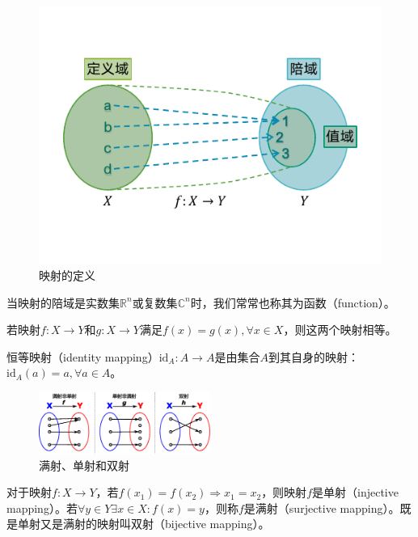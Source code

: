 \documentclass[../main.tex]{subfiles}
\begin{document}
\begin{figure}[htbp]
    \centering
    \includegraphics{../images/II.1.1.pdf}
    \caption{映射的定义}
    \label{fig:II.1.1}
\end{figure}

当映射的陪域是实数集$\mathbb{R}^n$或复数集$\mathbb{C}^n$时，我们常常也称其为函数（function）。

\begin{definition}[映射的相等]
    若映射$f:X\rightarrow Y$和$g:X\rightarrow Y$满足$f\left(x\right)=g\left(x\right),\forall x\in X$，则这两个映射相等。
\end{definition}

\begin{definition}[恒等映射]
    恒等映射（identity mapping）$\mathrm{id}_A:A\rightarrow A$是由集合$A$到其自身的映射：$\mathrm{id}_A\left(a\right)=a,\forall a\in A$。
\end{definition}

\begin{figure}[htbp]
    \centering
    \includegraphics[width=0.5\textwidth]{../images/II.1.2.eps}
    \caption{满射、单射和双射}
    \label{fig:II.1.2}
\end{figure}

\begin{definition}[单射、双射、满射]
    对于映射$f:X\rightarrow Y$，若$f\left(x_1\right)=f\left(x_2\right)\Rightarrow x_1=x_2$，则映射$f$是单射（injective mapping）。若$\forall y\in Y\exists x\in X:f\left(x\right)=y$，则称$f$是满射（surjective mapping）。既是单射又是满射的映射叫双射（bijective mapping）。
\end{definition}
\end{document}
